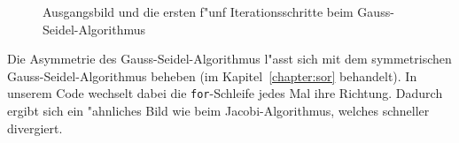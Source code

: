 \begin{refsection}
\begin{figure}
\centering 
{}\quad 
{}\quad 
{} 
\caption{Ausgangsbild und die ersten f"unf Iterationsschritte beim
Gauss-Seidel-Algorithmus\label{potential:gaussseidel}} 
\end{figure}

Die Asymmetrie des Gauss-Seidel-Algorithmus l"asst
sich mit dem symmetrischen Gauss-Seidel-Algorithmus beheben
(im Kapitel~\ref{chapter:sor} behandelt). In unserem Code wechselt dabei die
\texttt{for}-Schleife jedes Mal ihre Richtung. Dadurch ergibt
sich ein "ahnliches Bild wie beim Jacobi-Algorithmus, welches
schneller divergiert. 


\end{refsection}
